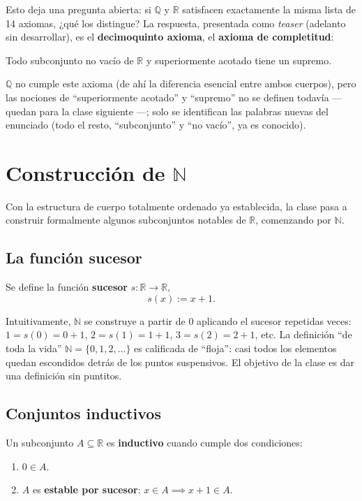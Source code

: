 \documentclass[12pt,a4paper]{article}
\begin{document}
Esto deja una pregunta abierta: si $\mathbb{Q}$ y $\mathbb{R}$ satisfacen
exactamente la misma lista de 14 axiomas, ¿qué los distingue? La respuesta,
presentada como \emph{teaser} (adelanto sin desarrollar), es el
\textbf{decimoquinto axioma}, el \textbf{axioma de completitud}:

\begin{keybox}
Todo subconjunto no vacío de $\mathbb{R}$ y superiormente acotado tiene un
supremo.
\end{keybox}

$\mathbb{Q}$ no cumple este axioma (de ahí la diferencia esencial entre
ambos cuerpos), pero las nociones de ``superiormente acotado'' y
``supremo'' no se definen todavía --- quedan para la clase siguiente ---;
solo se identifican las palabras nuevas del enunciado (todo el resto,
``subconjunto'' y ``no vacío'', ya es conocido).

\section{Construcción de $\mathbb{N}$}

Con la estructura de cuerpo totalmente ordenado ya establecida, la clase
pasa a construir formalmente algunos subconjuntos notables de
$\mathbb{R}$, comenzando por $\mathbb{N}$.

\subsection{La función sucesor}

Se define la función \textbf{sucesor} $s: \mathbb{R} \to \mathbb{R}$,
$$s(x) := x + 1.$$

Intuitivamente, $\mathbb{N}$ se construye a partir de $0$ aplicando el
sucesor repetidas veces: $1 = s(0) = 0+1$, $2 = s(1) = 1+1$,
$3 = s(2) = 2+1$, etc. La definición ``de toda la vida''
$\mathbb{N} = \{0,1,2,\ldots\}$ es calificada de ``floja'': casi todos los
elementos quedan escondidos detrás de los puntos suspensivos. El objetivo
de la clase es dar una definición sin puntitos.

\subsection{Conjuntos inductivos}

\begin{keybox}
Un subconjunto $A \subseteq \mathbb{R}$ es \textbf{inductivo} cuando cumple
dos condiciones:
\begin{enumerate}
  \item $0 \in A$.
  \item $A$ es \textbf{estable por sucesor}: $x \in A \implies x+1 \in A$.
\end{enumerate}
\end{keybox}
\end{document}
